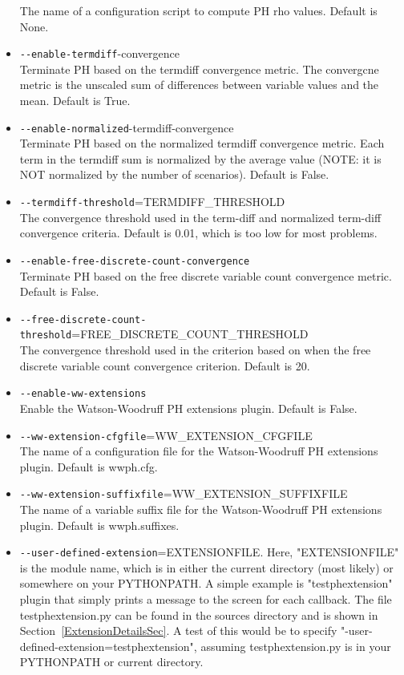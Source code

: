 \begin{itemize}
                        The name of a configuration script to compute PH rho values. Default is None.
  \item \verb|--enable-termdiff|-convergence\\
                        Terminate PH based on the termdiff convergence metric. The convergcne metric is the unscaled sum of differences between variable values and the mean. Default is True.
  \item \verb|--enable-normalized|-termdiff-convergence\\
                        Terminate PH based on the normalized termdiff
                        convergence metric. Each term in the termdiff sum is normalized by the average value (NOTE: it is NOT normalized by the number of scenarios). Default is False.
  \item \verb|--termdiff-threshold|=TERMDIFF\_THRESHOLD\\
                        The convergence threshold used in the term-diff and
                        normalized term-diff convergence criteria. Default is
                        0.01, which is too low for most problems. 
  \item \verb|--enable-free-discrete-count-convergence|\\
                        Terminate PH based on the free discrete variable count convergence metric. Default is False.
  \item \verb|--free-discrete-count-threshold|=FREE\_DISCRETE\_COUNT\_THRESHOLD\\
                        The convergence threshold used in the criterion based on when the free discrete variable count convergence criterion. Default is 20.
  \item \verb|--enable-ww-extensions|\\
                        Enable the Watson-Woodruff PH extensions plugin. Default is False.
  \item \verb|--ww-extension-cfgfile|=WW\_EXTENSION\_CFGFILE\\
                        The name of a configuration file for the Watson-Woodruff PH extensions plugin. Default is wwph.cfg.
  \item \verb|--ww-extension-suffixfile|=WW\_EXTENSION\_SUFFIXFILE\\
                        The name of a variable suffix file for the Watson-Woodruff PH extensions plugin. Default is wwph.suffixes.
   \item \verb|--user-defined-extension|=EXTENSIONFILE. Here, "EXTENSIONFILE" is the module name, which is in either the current directory (most likely) or somewhere on your PYTHONPATH. A simple example is "testphextension" plugin that simply prints a message to the screen for each callback. The file testphextension.py can be found in the sources directory and is shown in Section~\ref{ExtensionDetailsSec}. A test of this would be to specify "-user-defined-extension=testphextension", assuming testphextension.py is in your PYTHONPATH or current directory.
 

\end{itemize}
